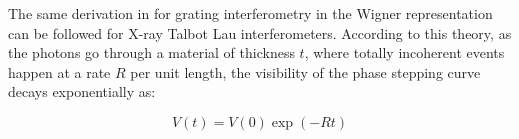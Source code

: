 The same derivation in \cite{Hornberger_2004} for grating interferometry in the Wigner representation can be followed for X-ray Talbot Lau interferometers. According to this theory, as the photons go through a material of thickness $t$, where totally incoherent events happen at a rate $R$ per unit length, the visibility of the phase stepping curve decays exponentially as:

\begin{equation}
V(t) = V(0)\exp(-Rt)
\end{equation}